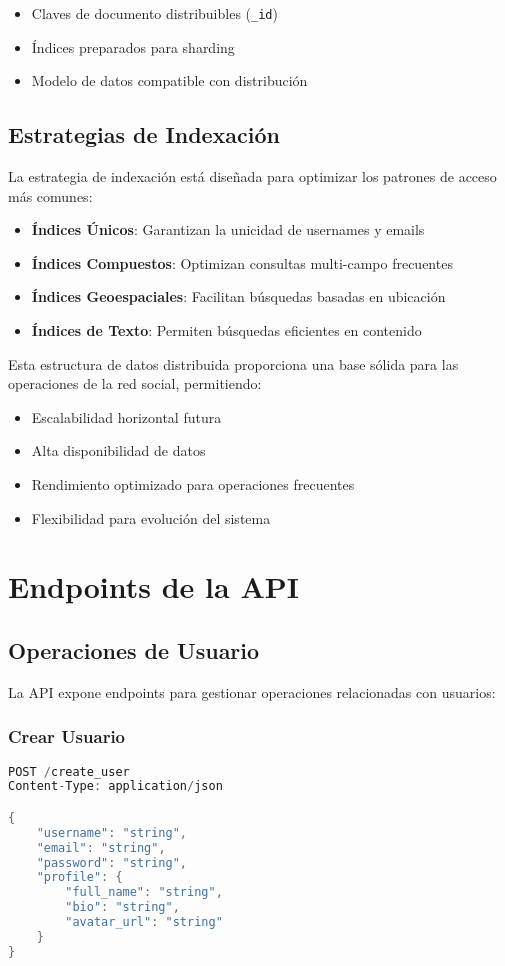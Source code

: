 \documentclass[12pt,letterpaper]{article}
\begin{document}
\begin{itemize}
    \item Claves de documento distribuibles (\texttt{\_id})
    \item Índices preparados para sharding
    \item Modelo de datos compatible con distribución
\end{itemize}

\subsection{Estrategias de Indexación}
La estrategia de indexación está diseñada para optimizar los patrones de acceso más comunes:

\begin{itemize}
    \item \textbf{Índices Únicos}: Garantizan la unicidad de usernames y emails
    \item \textbf{Índices Compuestos}: Optimizan consultas multi-campo frecuentes
    \item \textbf{Índices Geoespaciales}: Facilitan búsquedas basadas en ubicación
    \item \textbf{Índices de Texto}: Permiten búsquedas eficientes en contenido
\end{itemize}

Esta estructura de datos distribuida proporciona una base sólida para las operaciones de la red social, permitiendo:

\begin{itemize}
    \item Escalabilidad horizontal futura
    \item Alta disponibilidad de datos
    \item Rendimiento optimizado para operaciones frecuentes
    \item Flexibilidad para evolución del sistema
\end{itemize}

\section{Endpoints de la API}
\subsection{Operaciones de Usuario}
La API expone endpoints para gestionar operaciones relacionadas con usuarios:

\subsubsection{Crear Usuario}
\begin{lstlisting}[language=rust]
POST /create_user
Content-Type: application/json

{
    "username": "string",
    "email": "string",
    "password": "string",
    "profile": {
        "full_name": "string",
        "bio": "string",
        "avatar_url": "string"
    }
}
\end{lstlisting}
\end{document}
